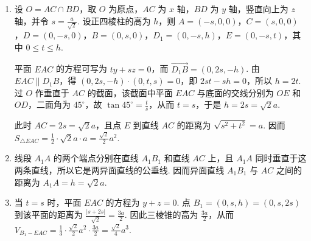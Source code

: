 \begin{solution}
\begin{enumerate}
\item 设 \(O=AC\cap BD\)，取 \(O\) 为原点，\(AC\) 为 \(x\) 轴，\(BD\) 为 \(y\) 轴，竖直向上为 \(z\) 轴，并令 \(s=\frac{a}{\sqrt{2}}\). 设正四棱柱的高为 \(h\)，则 \(A=(-s,0,0)\)，\(C=(s,0,0)\)，\(D=(0,-s,0)\)，\(B=(0,s,0)\)，\(D_1=(0,-s,h)\)，\(E=(0,-s,t)\)，其中 \(0\leqslant t\leqslant h\).

平面 \(EAC\) 的方程可写为 \(ty+sz=0\)，而 \(\overrightarrow{D_1B}=(0,2s,-h)\). 由 \(EAC\parallel D_1B\)，得 \((0,2s,-h)\cdot(0,t,s)=0\)，即 \(2st-sh=0\)，所以 \(h=2t\). 过 \(O\) 作垂直于 \(AC\) 的截面，该截面中平面 \(EAC\) 与底面的交线分别为 \(OE\) 和 \(OD\)，二面角为 \(45^{\circ}\)，故 \(\tan45^{\circ}=\frac{t}{s}\)，从而 \(t=s\)，于是 \(h=2s=\sqrt{2}a\).

此时 \(AC=2s=\sqrt{2}a\)，且点 \(E\) 到直线 \(AC\) 的距离为 \(\sqrt{s^2+t^2}=a\). 因而 \(S_{\triangle EAC}=\frac{1}{2}\cdot\sqrt{2}a\cdot a=\frac{\sqrt{2}}{2}a^2\).
\item 线段 \(A_1A\) 的两个端点分别在直线 \(A_1B_1\) 和直线 \(AC\) 上，且 \(A_1A\) 同时垂直于这两条直线，所以它是两异面直线的公垂线. 因而异面直线 \(A_1B_1\) 与 \(AC\) 之间的距离为 \(A_1A=h=\sqrt{2}a\).
\item 当 \(t=s\) 时，平面 \(EAC\) 的方程为 \(y+z=0\). 点 \(B_1=(0,s,h)=(0,s,2s)\) 到该平面的距离为 \(\frac{|s+2s|}{\sqrt{2}}=\frac{3a}{2}\). 因此三棱锥的高为 \(\frac{3a}{2}\)，从而 \(V_{B_1-EAC}=\frac{1}{3}\cdot\frac{\sqrt{2}}{2}a^2\cdot\frac{3a}{2}=\frac{\sqrt{2}}{4}a^3\).
\end{enumerate}
\end{solution}

